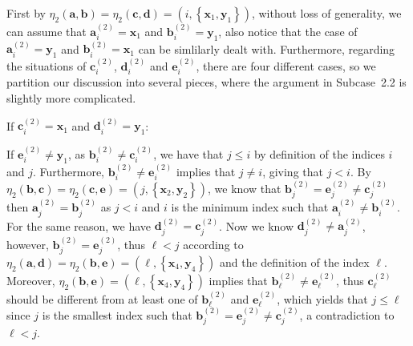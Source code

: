 \documentclass[11pt]{article}
\theoremstyle{definition}
\newcommand{\aaa}{\boldsymbol{a}}
\newcommand{\bb}{\boldsymbol{b}}
\newcommand{\cc}{\boldsymbol{c}}
\newcommand{\dd}{\boldsymbol{d}}
\newcommand{\ee}{\boldsymbol{e}}
\begin{document}
First by $\eta_{2}(\aaa,\bb)=\eta_{2}(\cc,\dd)=(i,\left\{\boldsymbol{x}_{1},\boldsymbol{y}_{1}\right\})$, without loss of generality, we can assume that $\aaa_{i}^{(2)}=\boldsymbol{x}_{1}$ and $\bb_{i}^{(2)}=\boldsymbol{y}_{1}$, also notice that the case of $\aaa_{i}^{(2)}=\boldsymbol{y}_{1}$ and $\bb_{i}^{(2)}=\boldsymbol{x}_{1}$ can be simlilarly dealt with. Furthermore, regarding the situations of $\cc_{i}^{(2)}$, $\dd_{i}^{(2)}$ and $\ee_{i}^{(2)}$, there are four different cases, so we partition our discussion into several pieces, where the argument in Subcase~2.2 is slightly more complicated. 

\begin{Case}
    \item If $\cc_{i}^{(2)}=\boldsymbol{x}_{1}$ and $\dd_{i}^{(2)}=\boldsymbol{y}_{1}$:  
    \begin{Case}
        \item If $\ee_{i}^{(2)}\neq \boldsymbol{y}_{1}$, as $\bb_{i}^{(2)}\neq \cc_{i}^{(2)}$, we have that $j\le i$ by definition of the indices $i$ and $j$. Furthermore, $\bb_{i}^{(2)}\neq \ee_{i}^{(2)}$ implies that $j\neq i$, giving that $j<i$. By $\eta_{2}(\bb,\cc)=\eta_{2}(\cc,\ee)=(j,\left\{\boldsymbol{x}_{2},\boldsymbol{y}_{2}\right\})$, we know that $\bb_{j}^{(2)}=\ee_{j}^{(2)}\neq\cc_{j}^{(2)}$ then $\boldsymbol{a}_{j}^{(2)}=\bb_{j}^{(2)}$ as $j<i$ and $i$ is the minimum index such that $\boldsymbol{a}_{i}^{(2)}\neq\bb_{i}^{(2)}$. For the same reason, we have $\dd_{j}^{(2)}=\boldsymbol{c}_{j}^{(2)}$. Now we know $\dd_{j}^{(2)}\neq\aaa_{j}^{(2)}$, however, $\bb_{j}^{(2)}=\ee_{j}^{(2)}$, thus $\ell<j$ according to $\eta_{2}(\aaa,\dd)=\eta_{2}(\bb,\ee)=(\ell,\left\{\boldsymbol{x}_{4},\boldsymbol{y}_{4}\right\})$ and the definition of the index $\ell$. Moreover, $\eta_{2}(\bb,\ee)=(\ell,\left\{\boldsymbol{x}_{4},\boldsymbol{y}_{4}\right\})$ implies that $\bb_{\ell}^{(2)}\neq\ee_{\ell}^{(2)}$, thus $\cc_{\ell}^{(2)}$ should be different from at least one of $\bb_{\ell}^{(2)}$ and $\ee_{\ell}^{(2)}$, which yields that $j\le \ell$ since $j$ is the smallest index such that $\bb_{j}^{(2)}=\ee_{j}^{(2)}\neq\cc_{j}^{(2)}$, a contradiction to $\ell<j$.


\end{Case}
\end{Case}
\end{document}
